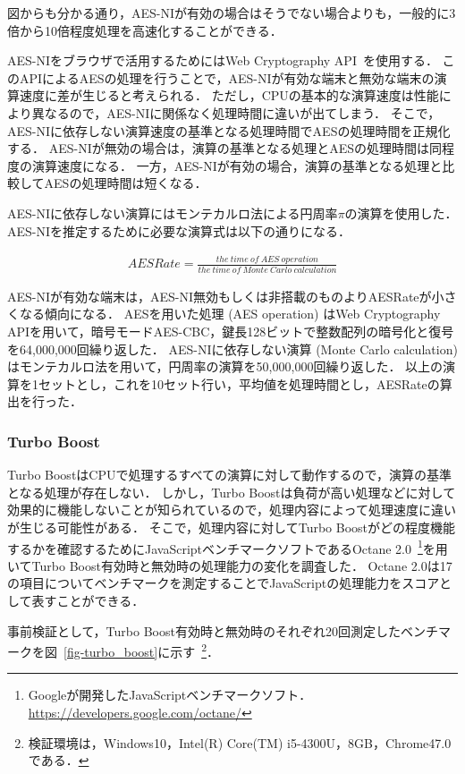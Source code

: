 図からも分かる通り，AES-NIが有効の場合はそうでない場合よりも，一般的に3倍から10倍程度処理を高速化することができる．

AES-NIをブラウザで活用するためにはWeb Cryptography API~\cite{web_crypto}を使用する．
このAPIによるAESの処理を行うことで，AES-NIが有効な端末と無効な端末の演算速度に差が生じると考えられる．
ただし，CPUの基本的な演算速度は性能により異なるので，AES-NIに関係なく処理時間に違いが出てしまう．
そこで，AES-NIに依存しない演算速度の基準となる処理時間でAESの処理時間を正規化する．
AES-NIが無効の場合は，演算の基準となる処理とAESの処理時間は同程度の演算速度になる．
一方，AES-NIが有効の場合，演算の基準となる処理と比較してAESの処理時間は短くなる．

AES-NIに依存しない演算にはモンテカルロ法による円周率$\pi$の演算を使用した．
AES-NIを推定するために必要な演算式は以下の通りになる．

\begin{eqnarray*}
  AESRate = \frac{the\ time\ of\ AES\ operation}{the\ time\ of\ Monte\ Carlo\ calculation}
\end{eqnarray*}

AES-NIが有効な端末は，AES-NI無効もしくは非搭載のものよりAESRateが小さくなる傾向になる．
AESを用いた処理 (AES operation) はWeb Cryptography APIを用いて，暗号モードAES-CBC，鍵長128ビットで整数配列の暗号化と復号を64,000,000回繰り返した．
AES-NIに依存しない演算 (Monte Carlo calculation) はモンテカルロ法を用いて，円周率の演算を50,000,000回繰り返した．
以上の演算を1セットとし，これを10セット行い，平均値を処理時間とし，AESRateの算出を行った．

\subsubsection{Turbo Boost}
Turbo BoostはCPUで処理するすべての演算に対して動作するので，演算の基準となる処理が存在しない．
しかし，Turbo Boostは負荷が高い処理などに対して効果的に機能しないことが知られているので，処理内容によって処理速度に違いが生じる可能性がある．
そこで，処理内容に対してTurbo Boostがどの程度機能するかを確認するためにJavaScriptベンチマークソフトであるOctane 2.0~\footnote{Googleが開発したJavaScriptベンチマークソフト．\url{https://developers.google.com/octane/}}を用いてTurbo Boost有効時と無効時の処理能力の変化を調査した．
Octane 2.0は17の項目についてベンチマークを測定することでJavaScriptの処理能力をスコアとして表すことができる．

事前検証として，Turbo Boost有効時と無効時のそれぞれ20回測定したベンチマークを図~\ref{fig-turbo_boost}に示す~\footnote{検証環境は，Windows10，Intel(R) Core(TM) i5-4300U，8GB，Chrome47.0である．}． 

